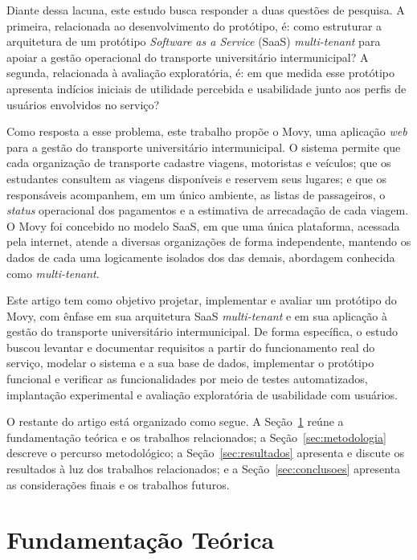 \documentclass[a4paper,12pt]{article}
\begin{document}
Diante dessa lacuna, este estudo busca responder a duas questões de pesquisa. A primeira, relacionada ao desenvolvimento do protótipo, é: como estruturar a arquitetura de um protótipo \textit{Software as a Service} (SaaS) \textit{multi-tenant} para apoiar a gestão operacional do transporte universitário intermunicipal? A segunda, relacionada à avaliação exploratória, é: em que medida esse protótipo apresenta indícios iniciais de utilidade percebida e usabilidade junto aos perfis de usuários envolvidos no serviço?

Como resposta a esse problema, este trabalho propõe o Movy, uma aplicação \textit{web} para a gestão do transporte universitário intermunicipal. O sistema permite que cada organização de transporte cadastre viagens, motoristas e veículos; que os estudantes consultem as viagens disponíveis e reservem seus lugares; e que os responsáveis acompanhem, em um único ambiente, as listas de passageiros, o \textit{status} operacional dos pagamentos e a estimativa de arrecadação de cada viagem. O Movy foi concebido no modelo SaaS, em que uma única plataforma, acessada pela internet, atende a diversas organizações de forma independente, mantendo os dados de cada uma logicamente isolados dos das demais, abordagem conhecida como \textit{multi-tenant}.

Este artigo tem como objetivo projetar, implementar e avaliar um protótipo do Movy, com ênfase em sua arquitetura SaaS \textit{multi-tenant} e em sua aplicação à gestão do transporte universitário intermunicipal. De forma específica, o estudo buscou levantar e documentar requisitos a partir do funcionamento real do serviço, modelar o sistema e a sua base de dados, implementar o protótipo funcional e verificar as funcionalidades por meio de testes automatizados, implantação experimental e avaliação exploratória de usabilidade com usuários.

O restante do artigo está organizado como segue. A Seção~\ref{sec:referencial} reúne a fundamentação teórica e os trabalhos relacionados; a Seção~\ref{sec:metodologia} descreve o percurso metodológico; a Seção~\ref{sec:resultados} apresenta e discute os resultados à luz dos trabalhos relacionados; e a Seção~\ref{sec:conclusoes} apresenta as considerações finais e os trabalhos futuros.

\section{Fundamentação Teórica}
\label{sec:referencial}
\end{document}
